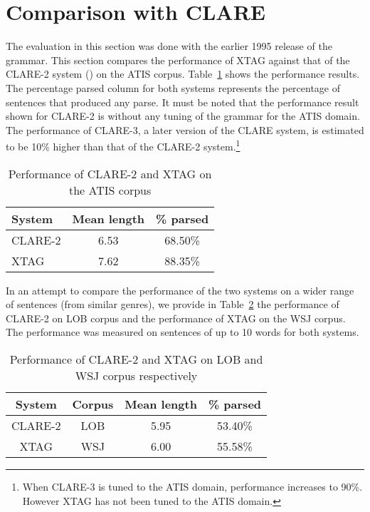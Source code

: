 
\section{Comparison with CLARE}

The evaluation in this section was done with the earlier 1995 release
of the grammar. This section compares the performance of XTAG against
that of the CLARE-2 system (\cite{clare-report92}) on the ATIS corpus.
Table~\ref{clare-results} shows the performance results. The
percentage parsed column for both systems represents the percentage of
sentences that produced any parse.  It must be noted that the
performance result shown for CLARE-2 is without any tuning of the
grammar for the ATIS domain. The performance of CLARE-3, a later
version of the CLARE system, is estimated to be 10\% higher than that
of the CLARE-2 system.\footnote{When CLARE-3 is tuned to the ATIS
  domain, performance increases to 90\%. However XTAG has not been
  tuned to the ATIS domain.}

\begin{table}[ht]
\centering
\begin{tabular}{|l|c|c|}  \hline
System & Mean length & \% parsed \\ \hline
CLARE-2  & 6.53 & 68.50\% \\ \hline
XTAG  & 7.62 & 88.35\% \\ \hline
\end{tabular}
\caption{Performance of CLARE-2 and XTAG on the ATIS corpus}
\label{clare-results}
\end{table}

In an attempt to compare the performance of the two systems on a wider
range of sentences (from similar genres), we provide in
Table~\ref{clare-results1} the performance of CLARE-2 on LOB corpus
and the performance of XTAG on the WSJ corpus. The performance was
measured on sentences of up to 10 words for both systems.
\begin{table}[ht]
\centering
\begin{tabular}{|c|c|c|c|}  \hline
System & Corpus & Mean length & \% parsed \\ \hline
CLARE-2 & LOB & 5.95 & 53.40\% \\ \hline
XTAG & WSJ & 6.00 & 55.58\% \\ \hline
\end{tabular}
\caption{Performance of CLARE-2 and XTAG on LOB and WSJ corpus
respectively}
\label{clare-results1}
\end{table}

